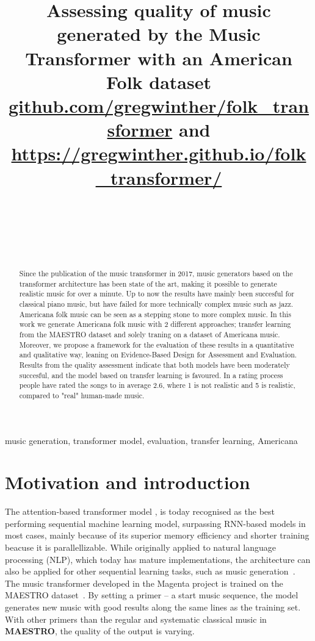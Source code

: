 \documentclass{IEEEtran}
\title{Assessing quality of music generated by the Music Transformer with an
American Folk dataset \\
\normalsize{\url{github.com/gregwinther/folk_transformer} and
\url{https://gregwinther.github.io/folk_transformer/}}}
\author{
    \IEEEauthorblockN{Sebastian G. Winther-Larsen} \\
    \IEEEauthorblockA{\textit{Center for Computing in Science Education,
        Department of Physics, University of Oslo} \\
    }
    \and
    \IEEEauthorblockN{Tom F.Hansen} \\
    \IEEEauthorblockA{\textit{Institute of Informatics, University of Oslo} \\ }
    \and
    \IEEEauthorblockN{Bjørn Iversen} \\
    \IEEEauthorblockA{\textit{Institute of Informatics, University of Oslo} \\ }
}
\begin{document}
\maketitle

\begin{abstract}
    Since the publication of the music transformer in 2017,
    music generators based on the transformer architecture has been state of the
    art, making it possible to generate realistic music for over a minute. Up to now
    the results have mainly been succesful for classical piano music, but have failed for
    more technically complex music such as jazz. Americana folk music can be seen
    as a stepping stone to more complex music. In this work we generate Americana
    folk music with 2 different approaches; transfer learning from the MAESTRO
    dataset and solely traning on a dataset of Americana music.
    Moreover, we propose
    a framework for the evaluation of these results in a quantitative and
    qualitative way, leaning on Evidence-Based Design 
    for Assessment and Evaluation. Results from the quality
    assessment indicate that both models have been moderately succesful, and the
    model based on transfer learning is favoured. In a rating process people have
    rated the songs to in average 2.6, where 1 is not realistic and 5 is
    realistic, compared to "real" human-made music.
\end{abstract}

\begin{IEEEkeywords}
    music generation, transformer model, evaluation,
    transfer learning, Americana
\end{IEEEkeywords}

\section{Motivation and introduction}

The attention-based transformer model \cite{vaswani2017attention}, is today
recognised as the best performing sequential machine learning model,
surpassing RNN-based models in most cases, mainly because of its
superior memory efficiency and shorter training beacuse it is parallellizable.
While originally applied to natural language processing (NLP),
which today has mature implementations,
the architecture can also be applied for other sequential learning tasks,
such as music generation~\cite{huang2018music}. The music transformer
developed in the Magenta project is trained on the MAESTRO
dataset~\cite{maestrodataset}. By setting a primer – a start music sequence,
the model generates new music with good results along the same lines as the
training set. With other primers than the regular and systematic classical
music in \textbf{MAESTRO}, the quality of the output is varying.
\end{document}
